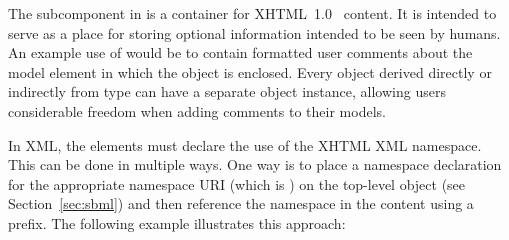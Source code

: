 \label{sec:notes}

The subcomponent \Notes in \SBase is a container for
XHTML~1.0~\citep{pemberton:2002} content.  It is intended to serve
as a place for storing optional information intended to be seen by
humans.  An example use of \Notes would be to contain formatted
user comments about the model element in which the \Notes object
is enclosed.  Every object derived directly or indirectly from
type \SBase can have a separate \Notes object instance, allowing
users considerable freedom when adding comments to their models.





In XML, the  elements must declare the use of
the XHTML XML namespace.  This can be done in multiple ways.  One
way is to place a namespace declaration for the appropriate
namespace URI (which is ) on the
top-level \SBML object (see Section~\ref{sec:sbml}) and then
reference the namespace in the  content using a
prefix.  The following example illustrates this approach:

